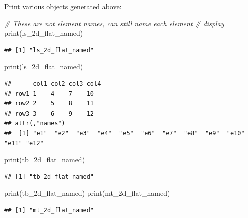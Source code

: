 \documentclass[
]{book}
\newenvironment{Shaded}{\begin{snugshade}}{\end{snugshade}}
\newcommand{\CommentTok}[1]{\textcolor[rgb]{0.56,0.35,0.01}{\textit{#1}}}
\newcommand{\FunctionTok}[1]{\textcolor[rgb]{0.00,0.00,0.00}{#1}}
\newcommand{\NormalTok}[1]{#1}
\newcommand{\StringTok}[1]{\textcolor[rgb]{0.31,0.60,0.02}{#1}}
\begin{document}
Print various objects generated above:

\begin{Shaded}
\begin{Highlighting}[]
\CommentTok{\# These are not element names, can still name each element}
\CommentTok{\# display}
\FunctionTok{print}\NormalTok{(}\StringTok{\textquotesingle{}ls\_2d\_flat\_named\textquotesingle{}}\NormalTok{)}
\end{Highlighting}
\end{Shaded}

\begin{verbatim}
## [1] "ls_2d_flat_named"
\end{verbatim}

\begin{Shaded}
\begin{Highlighting}[]
\FunctionTok{print}\NormalTok{(ls\_2d\_flat\_named)}
\end{Highlighting}
\end{Shaded}

\begin{verbatim}
##      col1 col2 col3 col4
## row1 1    4    7    10  
## row2 2    5    8    11  
## row3 3    6    9    12  
## attr(,"names")
##  [1] "e1"  "e2"  "e3"  "e4"  "e5"  "e6"  "e7"  "e8"  "e9"  "e10" "e11" "e12"
\end{verbatim}

\begin{Shaded}
\begin{Highlighting}[]
\FunctionTok{print}\NormalTok{(}\StringTok{\textquotesingle{}tb\_2d\_flat\_named\textquotesingle{}}\NormalTok{)}
\end{Highlighting}
\end{Shaded}

\begin{verbatim}
## [1] "tb_2d_flat_named"
\end{verbatim}

\begin{Shaded}
\begin{Highlighting}[]
\FunctionTok{print}\NormalTok{(tb\_2d\_flat\_named)}
\FunctionTok{print}\NormalTok{(}\StringTok{\textquotesingle{}mt\_2d\_flat\_named\textquotesingle{}}\NormalTok{)}
\end{Highlighting}
\end{Shaded}

\begin{verbatim}
## [1] "mt_2d_flat_named"
\end{verbatim}
\end{document}
